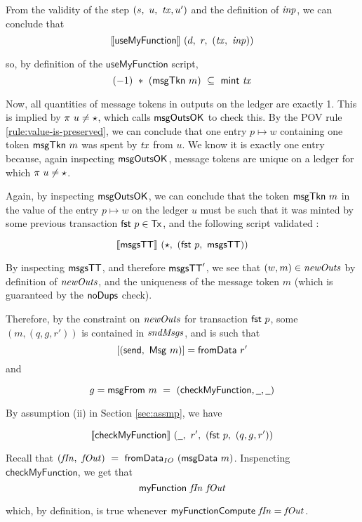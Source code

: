 From the validity of the step $(s,~u,~\mathit{tx}, u')$ and the definition of $\mathit{inp}$,
we can conclude that
\[ \llbracket\mathsf{useMyFunction}\rrbracket~(d,~r,~(\mathit{tx},~\mathit{inp})) \]

so, by definition of the $\mathsf{useMyFunction}$ script,
\[(-1)~*~(\mathsf{msgTkn}~m)~\subseteq~\mathsf{mint}~\mathit{tx}\]

Now, all quantities of message tokens in outputs on the ledger are exactly 1. This is
implied by $\pi~u \neq \star$, which calls $\mathsf{msgOutsOK}$ to check this.
By the POV rule \ref{rule:value-is-preserved},
we can conclude that one entry $p \mapsto w$ containing
one token $\mathsf{msgTkn}~m$ was spent by $\mathit{tx}$ from $u$. We know it is exactly one entry because,
again inspecting $\mathsf{msgOutsOK}$, message tokens are unique on a ledger for which
$\pi~u \neq \star$. \newline

Again, by inspecting $\mathsf{msgOutsOK}$, we can
conclude that the token $\mathsf{msgTkn}~m$ in the value of the entry $p \mapsto w$ on
the ledger $u$ must be such that it was minted by some previous transaction $\mathsf{fst}~p \in \mathsf{Tx}$,
and the following script validated :

\[\llbracket\mathsf{msgsTT}\rrbracket~(\star,~(\mathsf{fst}~p,~\mathsf{msgsTT}))\]

By inspecting $\mathsf{msgsTT}$, and therefore $\mathsf{msgsTT}'$, we see that $(w, m) \in \mathit{newOuts}$
by definition of $\mathit{newOuts}$, and the uniqueness of the message token $m$
(which is guaranteed by the $\mathsf{noDups}$ check). \newline

Therefore, by the constraint on $\mathit{newOuts}$ for transaction $\mathsf{fst}~p$,
some $(m, (q, g, r'))$ is contained in
$\mathit{sndMsgs}$, and is such that
\[[(\mathsf{send},~\mathsf{Msg}~m)] = \mathsf{fromData}~r' \]
and

\[g = \fun{msgFrom}~m~=~(\mathsf{checkMyFunction}, \wcard, \wcard)\]

By assumption (ii) in Section \ref{sec:assmp}, we have

\[\applyScript{\mathsf{checkMyFunction}}~(\wcard,~r',~(\fun{fst}~p,~(q, g, r')) \]

Recall that $(\mathit{fIn},~\mathit{fOut}) ~=~\mathsf{fromData}_{IO}~(\mathsf{msgData}~m)$.
Inspencting $\mathsf{checkMyFunction}$, we get that
\[\mathsf{myFunction}~\mathit{fIn}~\mathit{fOut}\]

which, by definition, is true whenever $\mathsf{myFunctionCompute}~\mathit{fIn} = \mathit{fOut}$. \newline

